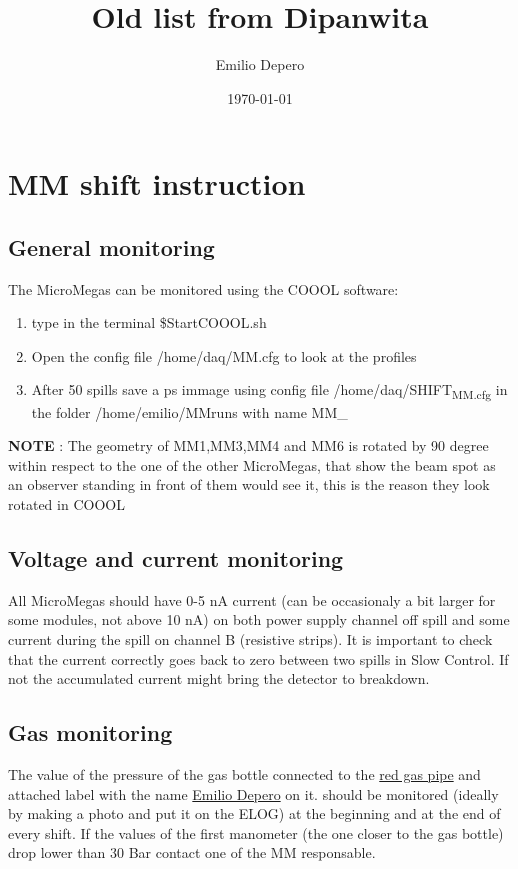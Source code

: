 \documentclass[a4paper]{article}
\author{Emilio Depero}
\date{\today}
\title{Old list from Dipanwita}
\begin{document}
\maketitle
\section{MM shift instruction}
\label{sec:org331ae60}
\subsection{General monitoring}
\label{sec:org71544ff}
The MicroMegas can be monitored using the COOOL software:
\begin{enumerate}
\item type in the terminal \$StartCOOOL.sh
\item Open the config file /home/daq/MM.cfg to look at the profiles
\item After 50 spills save a ps immage using config file /home/daq/SHIFT\textsubscript{MM.cfg} in the folder /home/emilio/MMruns with name MM\_<run number>
\end{enumerate}
\textbf{NOTE}  : The geometry of MM1,MM3,MM4 and MM6 is rotated by 90 degree within respect to the one of the other MicroMegas, that show the beam spot as an observer standing in front of them would see it,
this is the reason they look rotated in COOOL

\subsection{Voltage and current monitoring}
\label{sec:org9ca0442}
All MicroMegas should have 0-5 nA current (can be occasionaly a bit larger for some modules, not above 10 nA) on both power supply channel off spill
and some current during the spill on channel B (resistive strips). It is important to check that the current correctly
goes back to zero between two spills in Slow Control. If not the accumulated current might bring the
detector to breakdown.
\subsection{Gas monitoring}
\label{sec:orga03a7b6}
The value of the pressure of the gas bottle connected to the \uline{red gas pipe} and attached label with the name \uline{Emilio Depero} on it. 
should be monitored (ideally by making a photo and put it on the ELOG) at the beginning and at the end of every shift. If the values
of the first manometer (the one closer to the gas bottle) drop lower than 30 Bar contact one of the MM responsable.
\end{document}
